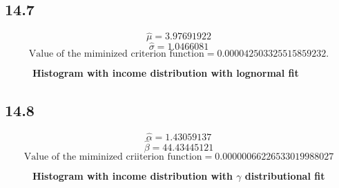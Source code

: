 \documentclass[letterpaper,12pt]{article}
\theoremstyle{definition}
\begin{document}
\subsection*{14.7}


\[\hat \mu= 3.97691922\]
\[\hat \sigma=1.0466081\] 
\[ \text{Value of the miminized criterion function} = 0.000042503325515859232.\]

\begin{figure}[htb]\centering \captionsetup{width=4.0in}
        \caption{\label{Histogram<800}\textbf{Histogram with income distribution with lognormal fit}}
\end{figure}

\subsection*{14.8}


\[\hat \alpha= 1.43059137\]
\[\hat \beta= 44.43445121\]
\[\text{Value  of  the  miminized  criiterion  function}=0.00000066226533019988027\]
\begin{figure}[htb]\centering \captionsetup{width=4.0in}
        \caption{\label{Histogram<800}\textbf{Histogram with income distribution with $\gamma$ distributional fit}}
\end{figure}
\newpage
\end{document}
